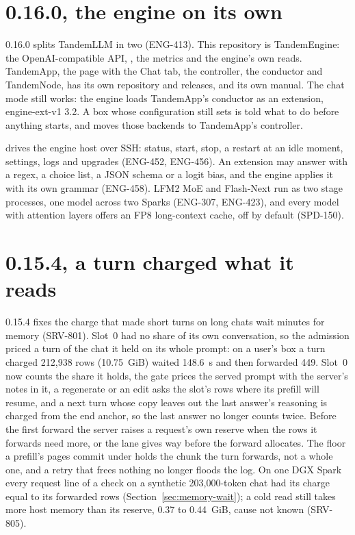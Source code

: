 \section{0.16.0, the engine on its own}\label{sec:changelog-0160}

0.16.0 splits TandemLLM in two (ENG-413). This repository is TandemEngine: the OpenAI-compatible API, , the metrics and the engine's own reads. TandemApp, the page with the Chat tab, the controller, the conductor and TandemNode, has its own repository and releases, and its own manual. The chat mode still works: the engine loads TandemApp's conductor as an extension, engine-ext-v1 3.2. A box whose configuration still sets  is told what to do before anything starts, and  moves those backends to TandemApp's controller.

 drives the engine host over SSH: status, start, stop, a restart at an idle moment, settings, logs and upgrades (ENG-452, ENG-456). An extension may answer  with a regex, a choice list, a JSON schema or a logit bias, and the engine applies it with its own grammar (ENG-458). LFM2 MoE and Flash-Next run as two stage processes, one model across two Sparks (ENG-307, ENG-423), and every model with attention layers offers an FP8 long-context cache, off by default (SPD-150).

\section{0.15.4, a turn charged what it reads}\label{sec:changelog-0154}

0.15.4 fixes the charge that made short turns on long chats wait minutes for memory (SRV-801). Slot~0 had no share of its own conversation, so the admission priced a turn of the chat it held on its whole prompt: on a user's box a turn charged 212,938 rows (10.75~GiB) waited 148.6~s and then forwarded 449. Slot~0 now counts the share it holds, the gate prices the served prompt with the server's notes in it, a regenerate or an edit asks the slot's rows where its prefill will resume, and a next turn whose copy leaves out the last answer's reasoning is charged from the end anchor, so the last answer no longer counts twice. Before the first forward the server raises a request's own reserve when the rows it forwards need more, or the lane gives way before the forward allocates. The floor a prefill's pages commit under holds the chunk the turn forwards, not a whole one, and a retry that frees nothing no longer floods the log. On one DGX Spark every request line of a check on a synthetic 203,000-token chat had its charge equal to its forwarded rows (Section~\ref{sec:memory-wait}); a cold read still takes more host memory than its reserve, 0.37 to 0.44~GiB, cause not known (SRV-805).

